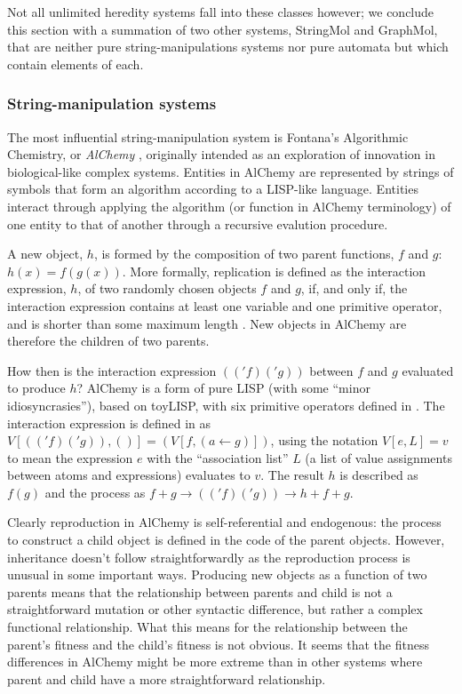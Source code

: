 Not all unlimited heredity systems fall into these classes however; we conclude this section with a summation of two other systems, StringMol and GraphMol, that are neither pure string-manipulations systems nor pure automata but which contain elements of each.

\subsubsection{String-manipulation systems}

The most influential string-manipulation system is Fontana's Algorithmic Chemistry, or \emph{AlChemy} \parencite{Fontana1992}, originally intended as an exploration of innovation in biological-like complex systems. Entities in AlChemy are represented by strings of symbols that form an algorithm according to a LISP-like language. Entities interact through applying the algorithm (or function in AlChemy terminology) of one entity to that of another through a recursive evalution procedure.

A new object, $h$, is formed by the composition of two parent functions, $f$ and $g$: $h(x)=f(g(x))$. More formally, replication is defined as the interaction expression, $h$, of two randomly chosen objects $f$ and $g$, if, and only if, the interaction expression contains at least one variable and one primitive operator, and is shorter than some maximum length \parencite[p.173--p.180]{Fontana1992}. New objects in AlChemy are therefore the children of two parents.

How then is the interaction expression $(('f)('g))$ between $f$ and $g$ evaluated to produce $h$? AlChemy is a form of pure LISP (with some ``minor idiosyncrasies''), based on toyLISP, with six primitive operators defined in \textcite[p.205]{Fontana1992}. The interaction expression is defined in \textcite[definition A.9, p.204]{Fontana1992} as $V[(('f)('g)),()] = (V[f,(a\leftarrow g)])$, using the notation $V[e,L]=v$ to mean the expression $e$ with the ``association list'' $L$ (a list of value assignments between atoms and expressions) evaluates to $v$. The result $h$ is described as $f(g)$ and the process as $f+g \rightarrow (('f)('g)) \rightarrow h + f + g$.

Clearly reproduction in AlChemy is self-referential and endogenous: the process to construct a child object is defined in the code of the parent objects. However, inheritance doesn't follow straightforwardly as the reproduction process is unusual in some important ways. Producing new objects as a function of two parents means that the relationship between parents and child is not a straightforward mutation or other syntactic difference, but rather a complex functional relationship. What this means for the relationship between the parent's fitness and the child's fitness is not obvious. It seems that the fitness differences in AlChemy might be more extreme than in other systems where parent and child have a more straightforward relationship.

